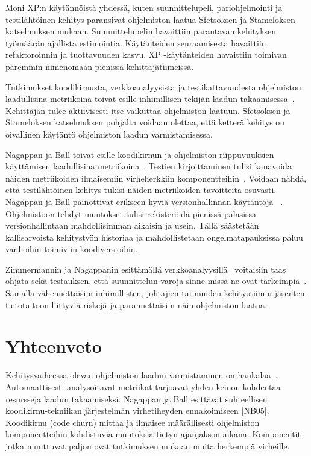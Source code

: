 \documentclass[finnish]{../tktltiki2}
\theoremstyle{definition}
\theoremstyle{remark}
\begin{document}
    Moni XP:n käytännöistä yhdessä, kuten suunnittelupeli, pariohjelmointi ja testilähtöinen kehitys paransivat 
ohjelmiston laatua Sfetsoksen ja Stameloksen katselmuksen mukaan. Suunnittelupelin havaittiin parantavan kehityksen 
työmäärän ajallista estimointia. Käytänteiden seuraamisesta havaittiin refaktoroinnin ja tuottavuuden kasvu. XP 
-käytänteiden havaittiin toimivan paremmin nimenomaan pienissä kehittäjätiimeissä.

    Tutkimukset koodikirnusta, verkkoanalyysista ja testikattavuudesta ohjelmiston laadullisina metriikoina toivat 
esille inhimillisen tekijän laadun takaamisessa~\cite{NB05, ZN08, MNDT09}. Kehittäjän tulee aktiivisesti itse vaikuttaa 
ohjelmiston laatuun. Sfetsoksen ja Stameloksen katselmuksen pohjalta voidaan olettaa, että ketterä kehitys on oivallinen 
käytäntö ohjelmiston laadun varmistamisessa.

    Nagappan ja Ball toivat esille koodikirnun ja ohjelmiston riippuvuuksien käyttämisen laadullisina 
metriikoina~\cite{NB05, NB07}. Testien kirjoittaminen tulisi kanavoida näiden metriikoiden ilmaisemiin virheherkkiin 
komponentteihin~\cite{MNDT09}. Voidaan nähdä, että testilähtöinen kehitys tukisi näiden metriikoiden tavoitteita 
osuvasti. Nagappan ja Ball painottivat erikseen hyviä versionhallinnan käytäntöjä ~\cite{NB05}. Ohjelmistoon tehdyt 
muutokset tulisi rekisteröidä pienissä palasissa versionhallintaan mahdollisimman aikaisin ja usein. Tällä säästetään 
kallisarvoista kehitystyön historiaa ja mahdollistetaan ongelmatapauksissa paluu vanhoihin toimiviin koodiversioihin.

    Zimmermannin ja Nagappanin esittämällä verkkoanalyysillä~\cite{ZN08} voitaisiin taas ohjata sekä testauksen, että 
suunnittelun varoja sinne missä ne ovat tärkeimpiä~\cite{NB07, MNDT09}. Samalla vähennettäisiin inhimillisten, johtajien 
tai muiden kehitystiimin jäsenten tietotaitoon liittyviä riskejä ja parannettaisiin näin ohjelmiston laatua.

\section{Yhteenveto}

Kehitysvaiheessa olevan ohjelmiston laadun varmistaminen on hankalaa~\cite{NB05, NB07, ZN08, MNDT09}. Automaattisesti 
analysoitavat metriikat tarjoavat yhden keinon kohdentaa resursseja laadun takaamiseksi. Nagappan ja Ball esittävät 
suhteellisen koodikirnu-tekniikan järjestelmän virhetiheyden ennakoimiseen [NB05]. Koodikirnu (code churn) mittaa ja 
ilmaisee määrällisesti ohjelmiston komponentteihin kohdistuvia muutoksia tietyn ajanjakson aikana. Komponentit jotka 
muuttuvat paljon ovat tutkimuksen mukaan muita herkempiä virheille.
\end{document}

